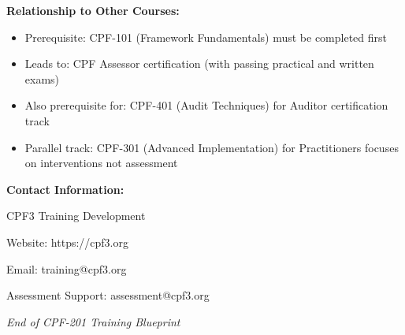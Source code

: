 \documentclass[11pt,a4paper]{article}
\begin{document}
\textbf{Relationship to Other Courses:}
\begin{itemize}
\item Prerequisite: CPF-101 (Framework Fundamentals) must be completed first
\item Leads to: CPF Assessor certification (with passing practical and written exams)
\item Also prerequisite for: CPF-401 (Audit Techniques) for Auditor certification track
\item Parallel track: CPF-301 (Advanced Implementation) for Practitioners focuses on interventions not assessment
\end{itemize}

\textbf{Contact Information:}

CPF3 Training Development

Website: https://cpf3.org

Email: training@cpf3.org

Assessment Support: assessment@cpf3.org

\vspace{2em}

\begin{center}
\textit{End of CPF-201 Training Blueprint}
\end{center}
\end{document}
